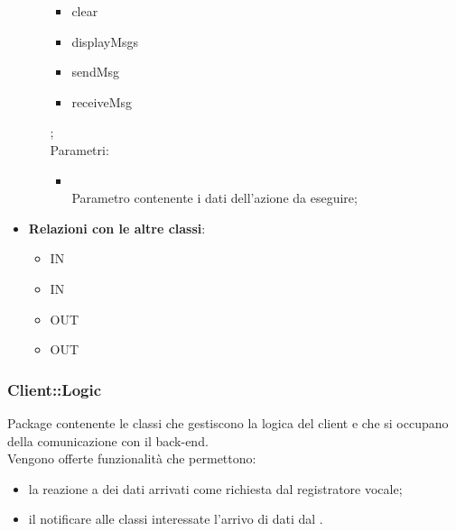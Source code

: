 \begin{itemize}
\begin{itemize}
		\begin{itemize}
			\item clear
			\item displayMsgs
			\item sendMsg
			\item receiveMsg
		\end{itemize};\\
		Parametri:
		\begin{itemize}
			\item {} \\
			Parametro contenente i dati dell'azione da eseguire;
		\end{itemize}
	\end{itemize}
	\item \textbf{Relazioni con le altre classi}:
	\begin{itemize}
		\item IN \hyperlink{ConversationApp_label}{}
		\item IN \hyperlink{ConversationView_label}{}
		\item OUT \hyperlink{ConversationAction_label}{}
		\item OUT \hyperlink{ConversationActionObserver_label}{}
	\end{itemize}
\end{itemize}
\FloatBarrier

\subsubsection{Client::Logic}
Package contenente le classi che gestiscono la logica del client e che si occupano della comunicazione con il back-end.\\
Vengono offerte funzionalità che permettono:
\begin{itemize}
	\item la reazione a dei dati arrivati come richiesta dal registratore vocale;
	\item il notificare alle classi interessate l'arrivo di dati dal .
\end{itemize}


